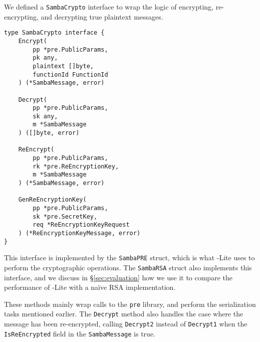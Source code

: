 We defined a \texttt{Samba\-Crypto} interface to wrap the logic of encrypting, re-encrypting, and decrypting true plaintext messages. 
\begin{lstlisting}
type SambaCrypto interface {
	Encrypt(
		pp *pre.PublicParams,
		pk any,
		plaintext []byte,
		functionId FunctionId
	) (*SambaMessage, error)

	Decrypt(
		pp *pre.PublicParams,
		sk any,
		m *SambaMessage
	) ([]byte, error)

	ReEncrypt(
		pp *pre.PublicParams,
		rk *pre.ReEncryptionKey,
		m *SambaMessage
	) (*SambaMessage, error)

	GenReEncryptionKey(
		pp *pre.PublicParams,
		sk *pre.SecretKey,
		req *ReEncryptionKeyRequest
	) (*ReEncryptionKeyMessage, error)
}
\end{lstlisting}
This interface is implemented by the \texttt{SambaPRE} struct, which is what \SystemName-Lite uses to perform the cryptographic operations.
The \texttt{SambaRSA} struct also implements this interface, and we discuss in \S\ref{sec:evaluation} how we use it to compare the performance of \SystemName-Lite with a na\"{i}ve RSA implementation.

These methods mainly wrap calls to the \texttt{pre} library, and perform the serialization tasks mentioned earlier. The \texttt{Decrypt} method also handles the case where the message has been re-encrypted, calling \texttt{Decrypt2} instead of \texttt{Decrypt1} when the \texttt{IsReEncrypted} field in the \texttt{SambaMessage} is true.




